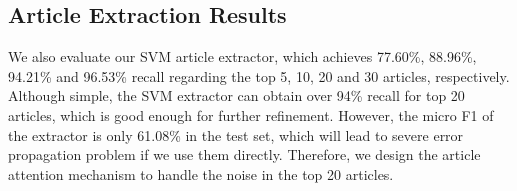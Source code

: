 \subsection{Article Extraction Results}
We also evaluate our SVM article extractor, which achieves 
77.60\%, 88.96\%, 94.21\% and 96.53\% recall regarding the top 5, 10, 20 and 30 articles, respectively.
Although simple, the SVM extractor can obtain over 94\% recall for top 20 articles, which is good enough for further refinement.
However, the micro F1 of the extractor is only 61.08\% in the test set, which will lead to severe error propagation problem if we use them directly. Therefore, we design the article attention mechanism to handle the noise in the top 20 articles.



